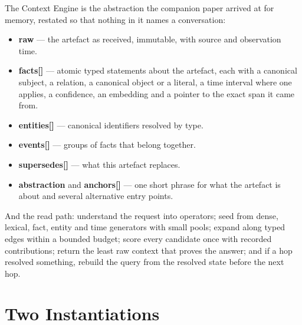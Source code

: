 \documentclass[11pt]{article}
\begin{document}
The Context Engine is the abstraction the companion paper
\cite{contextmemory} arrived at for memory, restated so that nothing in it
names a conversation:

\begin{itemize}
  \item \textbf{raw} --- the artefact as received, immutable, with source and
        observation time.
  \item \textbf{facts[]} --- atomic typed statements about the artefact, each
        with a canonical subject, a relation, a canonical object or a literal,
        a time interval where one applies, a confidence, an embedding and a
        pointer to the exact span it came from.
  \item \textbf{entities[]} --- canonical identifiers resolved by type.
  \item \textbf{events[]} --- groups of facts that belong together.
  \item \textbf{supersedes[]} --- what this artefact replaces.
  \item \textbf{abstraction} and \textbf{anchors[]} --- one short phrase for what
        the artefact is about and several alternative entry points.
\end{itemize}

And the read path: understand the request into operators; seed from dense,
lexical, fact, entity and time generators with small pools; expand along
typed edges within a bounded budget; score every candidate once with
recorded contributions; return the least raw context that proves the
answer; and if a hop resolved something, rebuild the query from the resolved
state before the next hop.

\section{Two Instantiations}
\end{document}
